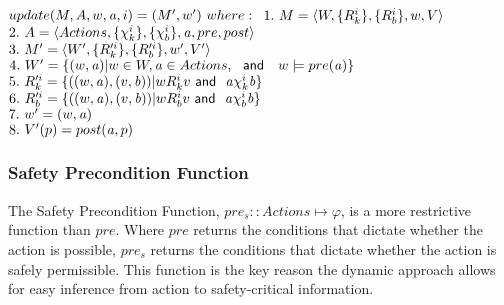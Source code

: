 $update(M,A,w,\laa,i) = (M',w')\ where:\\$
$1.\  M = \langle W, \{R_{k}^{i}\}, \{R_{b}^{i}\}, w, V \rangle$\\
$2.\  A = \langle Actions, \{\chi_{k}^i\}, \{\chi_{b}^i\}, \mathit{a}, pre, post \rangle$\\
$3.\  M' = \langle W', \{R_{k}'^{i}\}, \{R_{b}'^{i}\}, w', V' \rangle$\\
$4.\  W' = \{(w,\mathit{a}) | w\in W,\mathit{a} \in Actions,\ \textsf{\ and \ }\ w\models pre(\mathit{a})\}$\\
$5.\  R_{k}'^{i} = \{((w,\mathit{a}),(v,\mathit{b}))|wR_{k}^i v \textsf{\ and \ } \mathit{a} \chi_{k}^i \mathit{b} \}$\\
$6.\  R_{b}'^{i} = \{((w,\mathit{a}),(v,\mathit{b}))|wR_{b}^i v \textsf{\ and \ } \mathit{a} \chi_{b}^i \mathit{b} \}$\\
$7.\  w' = (w,\mathit{a})$\\ 
$8.\  V'(p) = post(\mathit{a},p)$

\subsubsection{Safety Precondition Function}
The Safety Precondition Function, $pre_s :: Actions \mapsto \varphi$, is a more restrictive function than $pre$. Where $pre$ returns the conditions that dictate whether the action is possible, $pre_s$ returns the conditions that dictate whether the action is safely permissible. This function is the key reason the dynamic approach allows for easy inference from action to safety-critical information.

